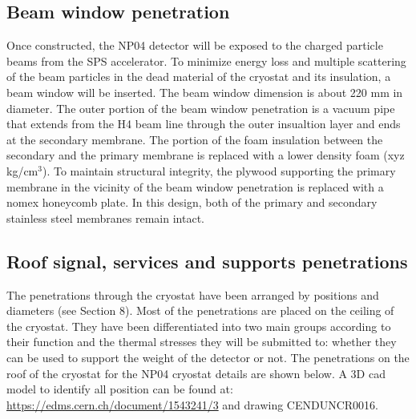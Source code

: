 \subsection{Beam window penetration}

Once constructed, the NP04 detector will be exposed to the charged particle beams from the SPS accelerator. To minimize energy loss and multiple scattering of the beam particles in the dead material of the cryostat and its insulation, a beam window will be inserted.  The beam window dimension is about 220 mm in diameter. The outer portion of the beam window penetration is a vacuum pipe that extends from the H4 beam line through the outer insualtion layer and ends at the secondary membrane. The portion of the foam insulation between the secondary and the primary membrane is replaced with a lower density foam (xyz kg/cm$^3$). To maintain structural integrity, the plywood supporting the primary membrane in the vicinity of the beam window penetration is replaced with a nomex honeycomb plate. In this design, both of the primary and secondary stainless steel membranes remain intact. 


\subsection{Roof signal, services and supports penetrations}

The penetrations through the cryostat have been arranged by positions and diameters (see Section 8). Most of the penetrations are placed on the ceiling of the cryostat. They have been differentiated into two main groups according to their function and the thermal stresses they will be submitted to: whether they can be used to support the weight of the detector or not.
The penetrations on the roof of the cryostat for the NP04 cryostat details are shown below.  A 3D cad model to identify all position can be found at:
\url{https://edms.cern.ch/document/1543241/3} and drawing CENDUNCR0016. 


